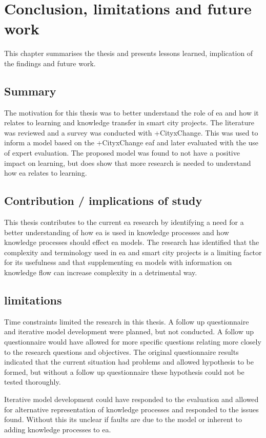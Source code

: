 \chapter{Conclusion, limitations and future work}
This chapter summarises the thesis and presents lessons learned, implication of the findings and future work.

\section{Summary}
The motivation for this thesis was to better understand the role of \gls{ea} and how it relates to learning and knowledge transfer in smart city projects. The literature was reviewed and a survey was conducted with +CityxChange. This was used to inform a model based on the +CityxChange \gls{eaf} and later evaluated with the use of expert evaluation. 
The proposed model was found to not have a positive impact on learning, but does show that more research is needed to understand how \gls{ea} relates to learning. 

\section{Contribution / implications of study}
This thesis contributes to the current \gls{ea} research by identifying a need for a better understanding of how \gls{ea} is used in knowledge processes and how knowledge processes should effect \gls{ea} models.
The research has identified that the complexity and terminology used in \gls{ea} and smart city projects is a limiting factor for its usefulness and that supplementing \gls{ea} models with information on knowledge flow can increase complexity in a detrimental way. 

\section{limitations}
Time constraints limited the research in this thesis. A follow up questionnaire and iterative model development were planned, but not conducted. 
A follow up questionnaire would have allowed for more specific questions relating more closely to the research questions and objectives. The original questionnaire results indicated that the current situation had problems and allowed hypothesis to be formed, but without a follow up questionnaire these hypothesis could not be tested thoroughly. 

Iterative model development could have responded to the evaluation and allowed for alternative representation of knowledge processes and responded to the issues found. Without this its unclear if faults are due to the model or inherent to adding knowledge processes to \gls{ea}.

